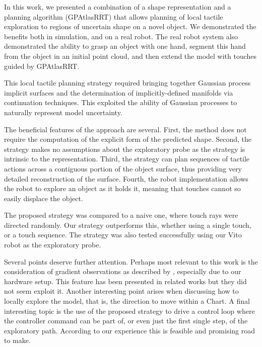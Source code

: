 In this work, we presented a combination of a shape representation and a planning algorithm (GPAtlasRRT) that allows planning of local tactile exploration to regions of uncertain shape on a novel object. We demonstrated the benefits both in simulation, and on a real robot. The real robot system also demonstrated the ability to grasp an object with one hand, segment this hand from the object in an initial point cloud, and then extend the model with touches guided by GPAtlasRRT.

This local tactile planning strategy required bringing together Gaussian process implicit surfaces and the determination of implicitly-defined manifolds via continuation techniques. This exploited the ability of Gaussian processes to naturally represent model uncertainty. 

The beneficial features of the approach are several. First, the method does not require the computation of the explicit form of the predicted shape. Second, the strategy makes no assumptions about the exploratory probe as the strategy is intrinsic to the representation. Third, the strategy can plan sequences of tactile actions across a contiguous portion of the object surface, thus providing very detailed reconstruction of the surface. Fourth, the robot implementation allows the robot to explore an object as it holds it, meaning that touches cannot so easily displace the object.

The proposed strategy was compared to a naive one, where touch rays were directed randomly. Our strategy outperforms this, whether using a single touch, or a touch sequence. The strategy was also tested successfully using our Vito robot as the exploratory probe.

Several points deserve further attention. Perhaps most relevant to this work is the consideration of gradient observations as described by \citet{Solak2003Derivative}, especially due to our hardware setup. This feature has been presented in related works but they did not seem exploit it. Another interesting point arises when discussing how to locally explore the model, that is, the direction to move within a Chart. 
A final interesting topic is the use of the proposed strategy to drive a control loop where the controller command can be part of, or even just the first single step, of the exploratory path. According to our experience this is feasible and promising road to make.
